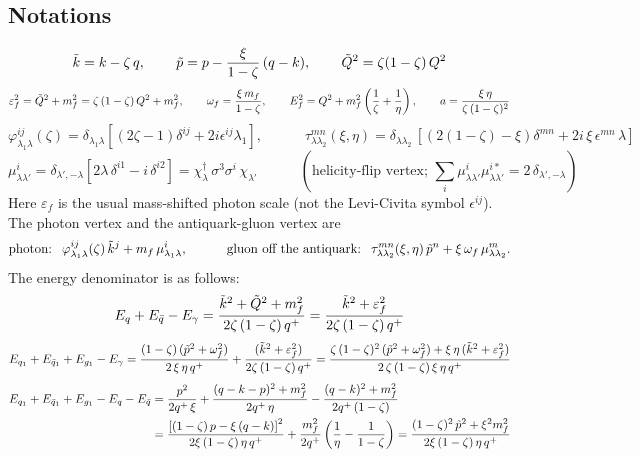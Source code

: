\documentclass[9pt]{article}
\newcommand{\eps}{\varepsilon_{f}}           %
\newcommand{\om}{\omega_{f}}                 %
\newcommand{\Ef}{E_{f}}                      %
\numberwithin{equation}{section}
\begin{document}
\subsection{Notations}
$$\Tilde{k} = k - \zeta\,q,\hspace{2em}\, \Tilde{p} = p - \frac{\xi}{1-\zeta}\, (q-k),\hspace{2em}\,\Tilde{Q}^{2} = \zeta(1-\zeta)\, Q^{2}$$
$$\eps^{2} = \Tilde{Q}^{2}+m^{2}_{f} = \zeta\,(1-\zeta)\,Q^{2}+m^{2}_{f},\hspace{2em} \om = \frac{\xi\,m_{f}}{1-\zeta},\hspace{2em} \Ef^{2} = Q^{2}+m^{2}_{f}\left(\frac{1}{\zeta}+\frac{1}{\eta}\right),\hspace{2em} a = \frac{\xi\,\eta}{\zeta\,(1-\zeta)^{2}}$$
$$\varphi^{ij}_{\lambda_{1}\lambda}(\zeta) = \delta_{\lambda_{1}\lambda}\left[(2\zeta -1)\delta^{ij} +2i\epsilon^{ij}\lambda_{1}\right],\hspace{3em} \tau^{mn}_{\lambda \lambda_{2}}(\xi,\eta) = \delta_{\lambda \lambda_{2}}\,\left[(2(1-\zeta)-\xi)\delta^{mn}+2i\,\xi\,\epsilon^{mn}\,\lambda\right] $$
$$\mu^{i}_{\lambda\lambda'} = \delta_{\lambda',-\lambda}\left[2\lambda\,\delta^{i1}-i\,\delta^{i2}\right] = \chi^{\dagger}_{\lambda}\,\sigma^{3}\sigma^{i}\,\chi_{\lambda'}\hspace{3em}(\text{helicity-flip vertex; } \textstyle\sum_{i}\mu^{i}_{\lambda\lambda'}\mu^{i*}_{\lambda\lambda'} = 2\,\delta_{\lambda',-\lambda})$$
Here $\eps$ is the usual mass-shifted photon scale (not the Levi-Civita symbol $\epsilon^{ij}$). The photon vertex and the antiquark-gluon vertex are
$$\text{photon: }\ \varphi^{ij}_{\lambda_{1}\lambda}(\zeta)\,\Tilde{k}^{j}+m_{f}\,\mu^{i}_{\lambda_{1}\lambda},\hspace{3em} \text{gluon off the antiquark: }\ \tau^{mn}_{\lambda\lambda_{2}}(\xi,\eta)\,\Tilde{p}^{n}+\xi\,\om\,\mu^{m}_{\lambda\lambda_{2}}.$$
The energy denominator is as follows:
$$E_{q}+E_{\Bar{q}}-E_{\gamma} = \frac{\Tilde{k}^{2}+\Tilde{Q}^{2}+m^{2}_{f}}{2\zeta\, (1-\zeta)\,q^{+}} = \frac{\Tilde{k}^{2}+\eps^{2}}{2\zeta\, (1-\zeta)\,q^{+}}$$
$$E_{q_{1}}+E_{\Bar{q}_{1}}+E_{g_{1}}-E_{\gamma} = \frac{(1-\zeta)\, (\Tilde{p}^{2}+\om^{2})}{2\,\xi\, \eta\,q^{+}} + \frac{(\Tilde{k}^{2}+\eps^{2})}{2\zeta\,(1-\zeta)\,q^{+}} = \frac{\zeta\,(1-\zeta)^{2}\,(\Tilde{p}^{2}+\om^{2})+\xi\,\eta\,(\Tilde{k}^{2}+\eps^{2})}{2\,\zeta\,(1-\zeta)\,\xi\,\eta\,q^{+}}$$
\begin{align*}E_{q_{1}}+E_{\Bar{q}_{1}}+E_{g_{1}}-E_{q}-E_{\Bar{q}} & = \frac{p^{2}}{2q^{+}\,\xi}+\frac{(q-k-p)^{2}+m^{2}_{f}}{2q^{+}\, \eta}-\frac{(q-k)^{2}+m^{2}_{f}}{2q^{+}\, (1-\zeta)} \\ & = \frac{\left[(1-\zeta)\,p - \xi\,(q-k)\right]^{2}}{2\xi\,(1-\zeta)\,\eta\,q^{+}}+\frac{m^{2}_{f}}{2q^{+}}\left(\frac{1}{\eta}-\frac{1}{1-\zeta}\right) = \frac{(1-\zeta)^{2}\,\Tilde{p}^{2}+\xi^{2}m^{2}_{f}}{2\xi\,(1-\zeta)\,\eta\,q^{+}}\end{align*}
\end{document}
